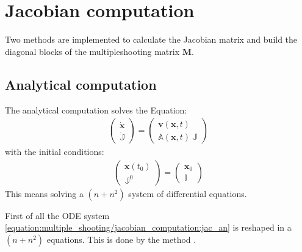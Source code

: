 \documentclass[letterpaper,10pt,english,openany,oneside]{sphinxmanual}
\begin{document}
\section{Jacobian computation}
\label{\detokenize{multiple_shooting/jacobian_computation:jacobian-computation}}\label{\detokenize{multiple_shooting/jacobian_computation::doc}}
Two methods are implemented to calculate the Jacobian matrix and build the diagonal blocks of the multiple\sphinxhyphen{}shooting matrix \(\textbf{M}\).


\subsection{Analytical computation}
\label{\detokenize{multiple_shooting/jacobian_computation:analytical-computation}}
The analytical computation solves the Equation:
\begin{equation}\label{equation:multiple_shooting/jacobian_computation:jac_an}
\begin{split}\begin{pmatrix} \dot{\mathbf{x}}\\ \dot{\mathbb{J}} \end{pmatrix} = \begin{pmatrix} \mathbf{v}(\mathbf{x}, t)\\ \mathbb{A}(\mathbf{x}, t) \ \mathbb{J} \end{pmatrix}\end{split}
\end{equation}
with the initial conditions:
\begin{equation}\label{equation:multiple_shooting/jacobian_computation:jac_an_initial_conditions}
\begin{split}\begin{pmatrix} {\mathbf{x}(t_0)}\\ {\mathbb{J}^{0}} \end{pmatrix} = \begin{pmatrix} \mathbf{x}_0 \\ \mathbb{I} \end{pmatrix}\end{split}
\end{equation}
This means solving a \((n+n^{2})\) system of differential equations.

First of all the ODE system \eqref{equation:multiple_shooting/jacobian_computation:jac_an} is reshaped in a \((n+n^{2})\) equations. This is done by the method .
\end{document}
